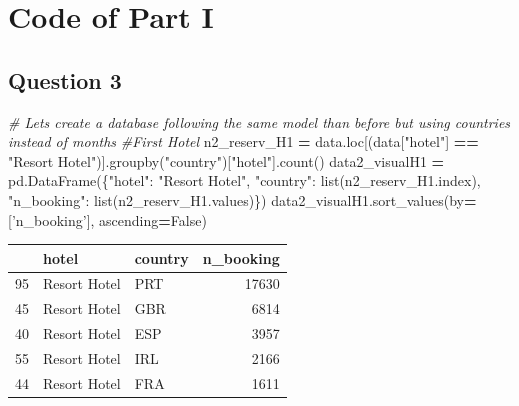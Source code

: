 \documentclass[10pt,a4paper]{article}
\newenvironment{Shaded}{\begin{snugshade}}{\end{snugshade}}
\newcommand{\BuiltInTok}[1]{#1}
\newcommand{\CommentTok}[1]{\textcolor[rgb]{0.56,0.35,0.01}{\textit{#1}}}
\newcommand{\NormalTok}[1]{#1}
\newcommand{\OperatorTok}[1]{\textcolor[rgb]{0.81,0.36,0.00}{\textbf{#1}}}
\newcommand{\StringTok}[1]{\textcolor[rgb]{0.31,0.60,0.02}{#1}}
\newcommand{\VariableTok}[1]{\textcolor[rgb]{0.00,0.00,0.00}{#1}}
\theoremstyle{break}
\begin{document}
\setcounter{page}{0}

\hypertarget{annexe:annexe1}{%
\section{Code of Part I}\label{annexe:annexe1}}

\hypertarget{question-3}{%
\subsection{Question 3}\label{question-3}}

\begin{Shaded}
\begin{Highlighting}[]
\CommentTok{# Lets create a database following the same model than before but using countries instead of months}
\CommentTok{#First Hotel}
\NormalTok{n2_reserv_H1 }\OperatorTok{=}\NormalTok{ data.loc[(data[}\StringTok{"hotel"}\NormalTok{] }\OperatorTok{==} \StringTok{"Resort Hotel"}\NormalTok{)].groupby(}\StringTok{"country"}\NormalTok{)[}\StringTok{"hotel"}\NormalTok{].count()}
\NormalTok{data2_visualH1 }\OperatorTok{=}\NormalTok{ pd.DataFrame(\{}\StringTok{"hotel"}\NormalTok{: }\StringTok{"Resort Hotel"}\NormalTok{,}
                                \StringTok{"country"}\NormalTok{: }\BuiltInTok{list}\NormalTok{(n2_reserv_H1.index),}
                                \StringTok{"n_booking"}\NormalTok{: }\BuiltInTok{list}\NormalTok{(n2_reserv_H1.values)\})}
\NormalTok{data2_visualH1.sort_values(by}\OperatorTok{=}\NormalTok{[}\StringTok{'n_booking'}\NormalTok{], ascending}\OperatorTok{=}\VariableTok{False}\NormalTok{)}
\end{Highlighting}
\end{Shaded}

\begin{longtable}[]{@{}rllr@{}}
\toprule
& hotel & country & n\_booking\tabularnewline
\midrule
\endhead
95 & Resort Hotel & PRT & 17630\tabularnewline
45 & Resort Hotel & GBR & 6814\tabularnewline
40 & Resort Hotel & ESP & 3957\tabularnewline
55 & Resort Hotel & IRL & 2166\tabularnewline
44 & Resort Hotel & FRA & 1611\tabularnewline
\bottomrule
\end{longtable}
\end{document}
